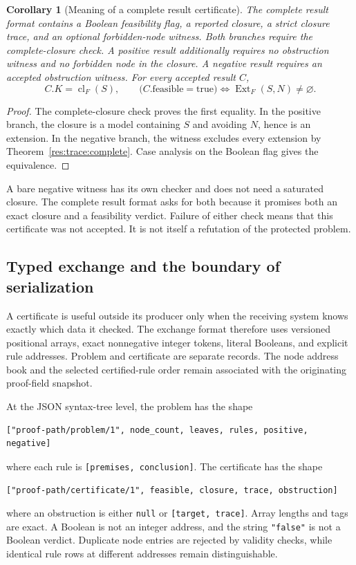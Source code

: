 \documentclass[11pt,oneside]{article}
\theoremstyle{komorebiplain}
\newtheorem{corollary}[theorem]{Corollary}
\theoremstyle{komorebidefinition}
\theoremstyle{komorebiremark}
\begin{document}
\clearpage
\begin{corollary}[Meaning of a complete result certificate]
\label{res:trace:verdict}
The complete result format contains a Boolean feasibility flag, a reported closure, a strict closure trace, and an optional forbidden-node witness. Both branches require the complete-closure check. A positive result additionally requires no obstruction witness and no forbidden node in the closure. A negative result requires an accepted obstruction witness. For every accepted result $C$,
\[
 C.K=\operatorname{cl}_F(S),\qquad
 \bigl(C.\mathrm{feasible}=\mathrm{true}\bigr)
 \Longleftrightarrow
 \operatorname{Ext}_F(S,N)\ne\varnothing.
\]
\end{corollary}
\begin{proof}
The complete-closure check proves the first equality. In the positive branch, the closure is a model containing $S$ and avoiding $N$, hence is an extension. In the negative branch, the witness excludes every extension by Theorem~\ref{res:trace:complete}. Case analysis on the Boolean flag gives the equivalence.
\end{proof}

A bare negative witness has its own checker and does not need a saturated closure. The complete result format asks for both because it promises both an exact closure and a feasibility verdict. Failure of either check means that this certificate was not accepted. It is not itself a refutation of the protected problem.

\subsection{Typed exchange and the boundary of serialization}
\label{sec:trace-wire}

A certificate is useful outside its producer only when the receiving system knows exactly which data it checked. The exchange format therefore uses versioned positional arrays, exact nonnegative integer tokens, literal Booleans, and explicit rule addresses. Problem and certificate are separate records. The node address book and the selected certified-rule order remain associated with the originating proof-field snapshot.

At the JSON syntax-tree level, the problem has the shape
\begin{lstlisting}[language={}]
["proof-path/problem/1", node_count, leaves, rules, positive, negative]
\end{lstlisting}
where each rule is \texttt{[premises, conclusion]}. The certificate has the shape
\begin{lstlisting}[language={}]
["proof-path/certificate/1", feasible, closure, trace, obstruction]
\end{lstlisting}
where an obstruction is either \texttt{null} or \texttt{[target, trace]}. Array lengths and tags are exact. A Boolean is not an integer address, and the string \texttt{"false"} is not a Boolean verdict. Duplicate node entries are rejected by validity checks, while identical rule rows at different addresses remain distinguishable.
\end{document}
